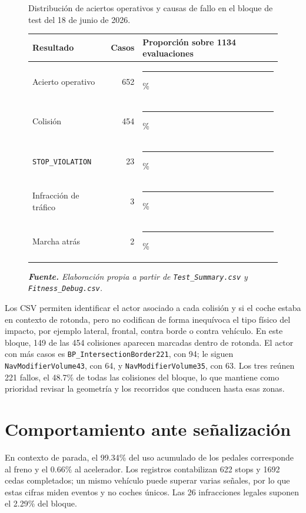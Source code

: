 \newpage
\begin{figure}[H]
\centering
\caption[Distribución de aciertos y causas de fallo en test.]{Distribución de aciertos operativos y causas de fallo en el bloque de test del 18 de junio de 2026.}%
\label{fig:distribucion-test}
\small
\begin{tabularx}{0.94\textwidth}{L{3.2cm}rX}
\toprule
\textbf{Resultado} & \textbf{Casos} & \textbf{Proporción sobre 1134 evaluaciones}\\
\midrule
Acierto operativo & 652 & \rule{4.60cm}{0.18cm}\%\\
Colisión & 454 & \rule{3.20cm}{0.18cm}\%\\
\texttt{STOP\_VIOLATION} & 23 & \rule{0.16cm}{0.18cm}\%\\
Infracción de tráfico & 3 & \rule{0.03cm}{0.18cm}\%\\
Marcha atrás & 2 & \rule{0.02cm}{0.18cm}\%\\
\bottomrule
\end{tabularx}
\caption*{\textit{\textbf{Fuente.} Elaboración propia a partir de \texttt{Test\_Summary.csv} y \texttt{Fitness\_Debug.csv}.}}
\end{figure}

Los CSV permiten identificar el actor asociado a cada colisión y si el coche estaba en contexto de rotonda, pero no codifican de forma inequívoca el tipo físico del impacto, por ejemplo lateral, frontal, contra borde o contra vehículo. En este bloque, 149 de las 454 colisiones aparecen marcadas dentro de rotonda. El actor con más casos es \texttt{BP\_IntersectionBorder221}, con 94; le siguen \texttt{NavModifierVolume43}, con 64, y \texttt{NavModifierVolume35}, con 63. Los tres reúnen 221 fallos, el 48.7\% de todas las colisiones del bloque, lo que mantiene como prioridad revisar la geometría y los recorridos que conducen hasta esas zonas.

\section{Comportamiento ante señalización}

En contexto de parada, el 99.34\% del uso acumulado de los pedales corresponde al freno y el 0.66\% al acelerador. Los registros contabilizan 622 stops y 1692 cedas completados; un mismo vehículo puede superar varias señales, por lo que estas cifras miden eventos y no coches únicos. Las 26 infracciones legales suponen el 2.29\% del bloque.

